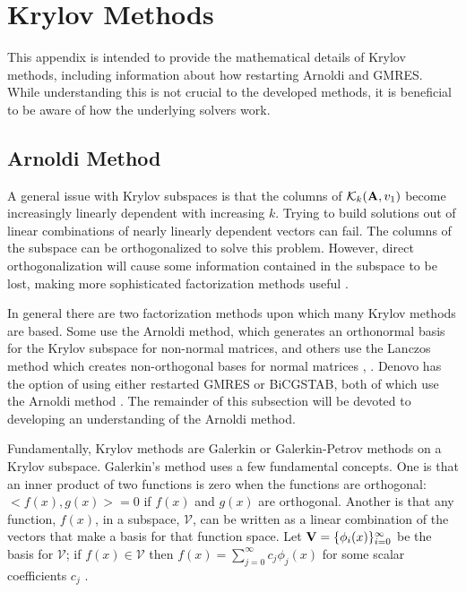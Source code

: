 
\chapter{Krylov Methods}
\label{sec:AppendixB}
This appendix is intended to provide the mathematical details of Krylov methods, including information about how restarting Arnoldi and GMRES. While understanding this is not crucial to the developed methods, it is beneficial to be aware of how the underlying solvers work. 

\section{Arnoldi Method}
A general issue with Krylov subspaces is that the columns of $\mathcal{K}_{k}(\mathbf{A},v_{1})$ become increasingly linearly dependent with increasing $k$. Trying to build solutions out of linear combinations of nearly linearly dependent vectors can fail. The columns of the subspace can be orthogonalized to solve this problem. However, direct orthogonalization will cause some information contained in the subspace to be lost, making more sophisticated factorization methods useful \cite{Stewart2001}. 

In general there are two factorization methods upon which many Krylov methods are based. Some use the Arnoldi method, which generates an orthonormal basis for the Krylov subspace for non-normal matrices, and others use the Lanczos method which creates non-orthogonal bases for normal matrices \cite{Knoll2004}, \cite{Stewart2001}. Denovo has the option of using either restarted GMRES or BiCGSTAB, both of which use the Arnoldi method \cite{Evans2009}.  The remainder of this subsection will be devoted to developing an understanding of the Arnoldi method.

Fundamentally, Krylov methods are Galerkin or Galerkin-Petrov methods on a Krylov subspace. Galerkin's method uses a few fundamental concepts. One is that an inner product of two functions is zero when the functions are orthogonal: $<f(x), g(x)> = 0$ if $f(x)$ and $g(x)$ are orthogonal. Another is that any function, $f(x)$, in a subspace, $\mathcal{V}$, can be written as a linear combination of the vectors that make a basis for that function space. Let $\mathbf{V} = \{\phi_{i}(x) \}_{i=0}^{\infty}$ be the basis for $\mathcal{V}$; if $f(x) \in \mathcal{V}$ then $f(x) = \sum_{j=0}^{\infty} c_{j} \phi_{j}(x)$ for some scalar coefficients $c_{j}$ \cite{Matthews2005}.  

